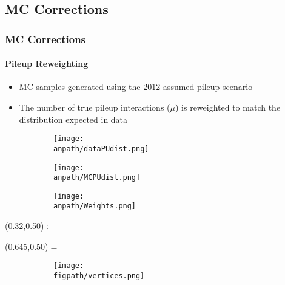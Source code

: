 

\subsection*{MC Corrections}


\begin{frame}
	\frametitle{MC Corrections}
	\framesubtitle{Pileup Reweighting}
	\vspace*{-0.24cm}
	\begin{block}{}
		\begin{itemize}
			\small
			\item MC samples generated using the 2012 assumed pileup scenario
			\item The number of true pileup interactions ($\mu$) is reweighted to match the distribution expected in data
		\end{itemize}
	\end{block}
	\begin{figure}
		\centering
		\begin{subfigure}[t]{0.32\textwidth}
			\texttt{[image: \\anpath/dataPUdist.png]}
		\end{subfigure}
		\begin{subfigure}[t]{0.32\textwidth}
			\texttt{[image: \\anpath/MCPUdist.png]}
		\end{subfigure}
		\begin{subfigure}[t]{0.32\textwidth}
			\texttt{[image: \\anpath/Weights.png]}
		\end{subfigure}
	\end{figure}
	\begin{textblock}{0.2}(0.32,0.50){\color{red}$\div$}\end{textblock}
	\begin{textblock}{0.2}(0.645,0.50){\color{blue}$=$}\end{textblock}
	\vspace*{-0.30cm}
	\begin{figure}
		\centering
		\begin{subfigure}[t]{0.32\textwidth}
			\texttt{[image: \\figpath/vertices.png]}
		\end{subfigure}

\end{figure}
\end{frame}
